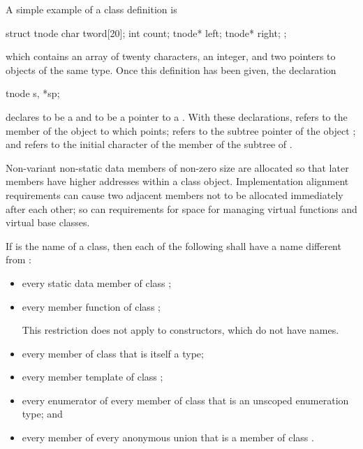 \pnum
\begin{example}
A simple example of a class definition is
\begin{codeblock}
struct tnode {
  char tword[20];
  int count;
  tnode* left;
  tnode* right;
};
\end{codeblock}
which contains an array of twenty characters, an integer, and two
pointers to objects of the same type. Once this definition has been
given, the declaration
\begin{codeblock}
tnode s, *sp;
\end{codeblock}
declares  to be a  and  to be a pointer
to a . With these declarations,  refers to
the  member of the object to which  points;
 refers to the  subtree pointer of the object
; and  refers to the initial character
of the  member of the  subtree of .
\end{example}

\pnum
\begin{note}
%
Non-variant non-static data members of
non-zero size
are allocated so that later
members have higher addresses within a class object.
Implementation alignment requirements can cause two adjacent members
not to be allocated immediately after each other; so can requirements
for space for managing virtual functions and
virtual base classes.
\end{note}

\pnum
If  is the name of a class, then each of the following shall
have a name different from :
\begin{itemize}
\item every static data member of class ;

\item every member function of class ;
\begin{note}
This restriction does not apply to constructors, which do not have
names.
\end{note}%

\item every member of class  that is itself a type;

\item every member template of class ;

\item every enumerator of every member of class  that is an
unscoped enumeration type; and

\item every member of every anonymous union that is a member of class
.
\end{itemize}

